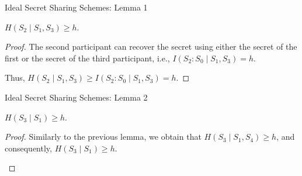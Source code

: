 \documentclass[aspectratio=169]{beamer}
\begin{document}
\begin{frame}{Ideal Secret Sharing Schemes: Lemma 1}
    \begin{lemma}
        $H(S_2 \mid S_1, S_3) \ge h$.
    \end{lemma}

    \begin{proof}
        The second participant can recover the secret using either the secret of the first or the secret of the third participant,
        i.e., $I(S_2 : S_0 \mid S_1, S_3) = h$.
        \begin{center}
        \end{center}
        Thus, $H(S_2 \mid S_1, S_3) \ge I(S_2 : S_0 \mid S_1, S_3) = h$.
    \end{proof}
\end{frame}

\begin{frame}{Ideal Secret Sharing Schemes: Lemma 2}
    \begin{lemma}
        $H(S_3 \mid S_1) \ge h$.
    \end{lemma}

    \begin{proof}
        Similarly to the previous lemma, we obtain that $H(S_3 \mid S_1, S_4) \ge h$, and consequently,
        $H(S_3 \mid S_1) \ge h$.
        \begin{center}
        \end{center}
    \end{proof}
\end{frame}
\end{document}
